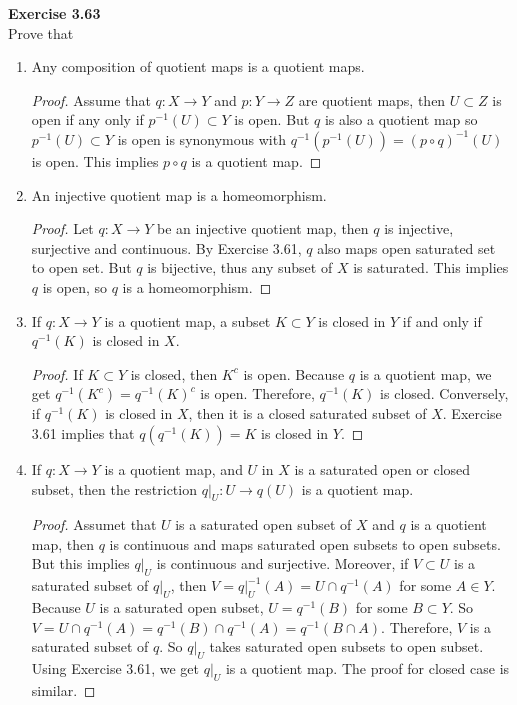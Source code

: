 \documentclass[12pt, a4paper]{article}
\theoremstyle{plain}
\newenvironment{exercise}[2][Exercise]
    { \begin{mdframed}[backgroundcolor=gray!20] \textbf{#1 #2} \\}
    {  \end{mdframed}}
\begin{document}
\begin{exercise}{3.63}
Prove that
\begin{enumerate}[label=(\alph*)]
\item Any composition of quotient maps is a quotient maps.
	\begin{proof}
	Assume that $q: X\rightarrow Y$ and $p:Y\rightarrow Z$ are quotient maps, then $U\subset Z$ is open if any only if $p^{-1}(U)\subset Y$ is open. But $q$ is also a quotient map so $p^{-1}(U)\subset Y$ is open is synonymous with $q^{-1}(p^{-1}(U)) = (p\circ q)^{-1}(U)$ is open. This implies $p\circ q$ is a quotient map.
	\end{proof}

\item An injective quotient map is a homeomorphism.
	\begin{proof}
	Let $q:X\rightarrow Y$ be an injective quotient map, then $q$ is injective, surjective and continuous. By Exercise 3.61, $q$ also maps open saturated set to open set. But $q$ is bijective, thus any subset of $X$ is saturated. This implies $q$ is open, so $q$ is a homeomorphism.
	\end{proof}
	
\item If $q:X\rightarrow Y$ is a quotient map, a subset $K\subset Y$ is closed in $Y$ if and only if $q^{-1}(K)$ is closed in $X$.
	\begin{proof}
	If $K\subset Y$ is closed, then $K^c$ is open. Because $q$ is a quotient map, we get $q^{-1}(K^c)=q^{-1}(K)^c$ is open. Therefore, $q^{-1}(K)$ is closed. Conversely, if $q^{-1}(K)$ is closed in $X$, then it is a closed saturated subset of $X$. Exercise 3.61 implies that $q(q^{-1}(K))=K$ is closed in $Y$.
	\end{proof}
	
\item If $q:X\rightarrow Y$ is a quotient map, and $U$ in $X$ is a saturated open or closed subset, then the restriction $q|_U: U\rightarrow q(U)$ is a quotient map. 
	\begin{proof}
	Assumet that $U$ is a saturated open subset of $X$ and $q$ is a quotient map, then $q$ is continuous and maps saturated open subsets to open subsets. But this implies $q|_U$ is continuous and surjective. Moreover, if $V\subset U$ is a saturated subset of $q|_U$, then $V=q|_U^{-1}(A)=U\cap q^{-1}(A)$ for some $A\in Y$. Because $U$ is a saturated open subset, $U=q^{-1}(B)$ for some $B\subset Y$. So $V=U\cap q^{-1}(A)=q^{-1}(B)\cap q^{-1}(A)=q^{-1}(B\cap A)$. Therefore, $V$ is a saturated subset of $q$. So $q|_U$ takes saturated open subsets to open subset. Using Exercise 3.61, we get $q|_U$ is a quotient map. The proof for closed case is similar.
	\end{proof}
	

\end{enumerate}
\end{exercise}
\end{document}
